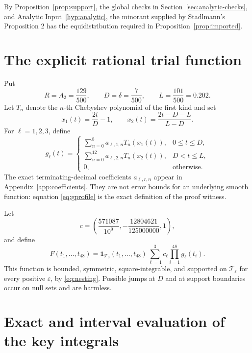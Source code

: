 \documentclass[11pt]{article}
\theoremstyle{definition}
\theoremstyle{remark}
\newcommand{\one}{\mathbf 1}
\newcommand{\TT}{\mathcal T}
\newcommand{\eps}{\varepsilon}
\begin{document}
By Proposition~\ref{prop:support}, the global checks in
Section~\ref{sec:analytic-checks}, and Analytic Input~\ref{hyp:analytic}, the
minorant supplied by Stadlmann's Proposition 2 has the equidistribution
required in Proposition~\ref{prop:imported}.

\section{The explicit rational trial function}
\label{sec:trial}

Put
\[
 R=A_2=\frac{129}{500},\qquad D=\delta=\frac7{500},
 \qquad L=\frac{101}{500}=0.202.
\]
Let \(T_n\) denote the \(n\)-th Chebyshev polynomial of the first kind and set
\[
 x_1(t)=\frac{2t}{D}-1,
 \qquad
 x_2(t)=\frac{2t-D-L}{L-D}.
\]
For \(\ell=1,2,3\), define
\begin{equation}
\label{eq:gprofile}
 g_\ell(t)=
 \begin{cases}
   \displaystyle\sum_{n=0}^{8}a_{\ell,1,n}T_n(x_1(t)),&0\leq t\leq D,\\[4pt]
   \displaystyle\sum_{n=0}^{12}a_{\ell,2,n}T_n(x_2(t)),&D<t\leq L,\\[4pt]
   0,&\text{otherwise}.
 \end{cases}
\end{equation}
The exact terminating-decimal coefficients \(a_{\ell,r,n}\) appear in
Appendix~\ref{app:coefficients}.  They are not error bounds for an underlying
smooth function: equation \eqref{eq:gprofile} is the exact definition of the
proof witness.

Let
\begin{equation}
\label{eq:vector}
 c=\left(\frac{571087}{10^9},
          -\frac{12804621}{125000000},1\right),
\end{equation}
and define
\begin{equation}
\label{eq:F}
 F(t_1,\ldots,t_{48})=
 \one_{\TT_0}(t_1,\ldots,t_{48})
 \sum_{\ell=1}^3c_\ell\prod_{i=1}^{48}g_\ell(t_i).
\end{equation}
This function is bounded, symmetric, square-integrable, and supported on
\(\TT_\eps\) for every positive \(\eps\), by \eqref{eq:nesting}.  Possible
jumps at \(D\) and at support boundaries occur on null sets and are harmless.

\section{Exact and interval evaluation of the key integrals}
\label{sec:integrals}
\end{document}
